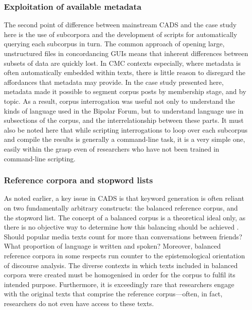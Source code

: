 \subsubsection{Exploitation of available metadata}

The second point of difference between mainstream \gls{CADS} and the case study here is the use of subcorpora and the development of scripts for automatically querying each subcorpus in turn. The common approach of opening large, unstructured files in concordancing GUIs means that inherent differences between subsets of data are quickly lost. In \gls{CMC} contexts especially, where metadata is often automatically embedded within texts, there is little reason to disregard the affordances that metadata may provide. In the case study presented here, metadata made it possible to segment corpus posts by membership stage, and by  topic. As a result, corpus interrogation was useful not only to understand the kinds of language used in the Bipolar Forum, but to understand language use in subsections of the corpus, and the interrelationship between these parts. It must also be noted here that while scripting interrogations to loop over each subcorpus and compile the results is generally a command-line task, it is a very simple one, easily within the grasp even of researchers who have not been trained in command-line scripting.

\subsubsection{Reference corpora and stopword lists}

As noted earlier, a key issue in \gls{CADS} is that keyword generation is often reliant on two fundamentally arbitrary constructs: the balanced reference corpus, and the stopword list. The concept of a balanced corpus is a theoretical ideal only, as there is no objective way to determine how this balancing should be achieved \cite{baker_corpora_2013}. Should popular media texts count for more than conversations between friends? What proportion of language is written and spoken? Moreover, balanced reference corpora in some respects run counter to the epistemological orientation of discourse analysis. The diverse contexts in which texts included in balanced corpora were created must be homogenised in order for the corpus to fulfil its intended purpose. Furthermore, it is exceedingly rare  that researchers engage with the original texts that comprise the reference corpus---often, in fact, researchers do not even have access to these texts.

